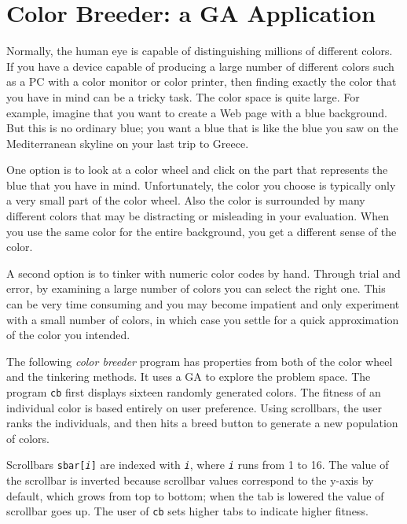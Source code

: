 \section{Color Breeder: a GA Application}

Normally, the human eye is capable of distinguishing millions of
different colors. If you have a device capable of producing a large
number of different colors such as a PC with a color monitor or color
printer, then finding exactly the color that you have in mind can be a
tricky task. The color space is quite large. For example, imagine that
you want to create a Web page with a blue background. But this is no
ordinary blue; you want a blue that is like the blue you saw on the
Mediterranean skyline on your last trip to Greece.

One option is to look at a color wheel and click on the part that
represents the blue that you have in mind. Unfortunately,
the color you choose is typically only a very small part of the
color wheel. Also the color is surrounded by many different colors that
may be distracting or misleading in your evaluation. When you use the
same color for the entire background, you get a different sense of the
color. 

A second option is to tinker with numeric color codes by hand. Through
trial and error, by examining a large number of colors you can select
the right one. This can be very time consuming and you may become
impatient and only experiment with a small number of colors, in which
case you settle for a quick approximation of the color you intended.

The following \textit{color breeder} program has properties from both of
the color wheel and the tinkering methods. It uses a GA to explore the
problem space. The program \texttt{cb} first displays sixteen randomly
generated colors. The fitness of an individual color is based entirely
on user preference. Using scrollbars, the user ranks the individuals,
and then hits a breed button to generate a new population of colors. 

Scrollbars \texttt{sbar[\textit{i}]} are indexed with
\texttt{\textit{i}}, where \texttt{\textit{i}} runs from 1 to
16. The value of the scrollbar is inverted because scrollbar values
correspond to the y-axis by default, which grows from top to bottom;
when the tab is lowered the value of scrollbar goes up. The user of
\texttt{cb} sets higher tabs to indicate higher fitness.


